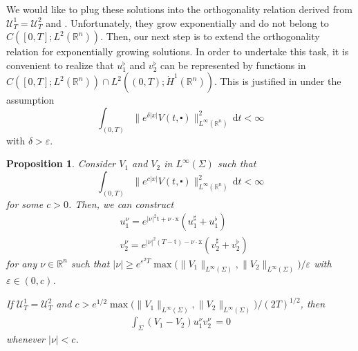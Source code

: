 \documentclass[10pt,a4paper]{amsart}
\newtheorem{proposition}{Proposition}[section]
\newcommand{\R}{\mathbb{R}}
\newcommand{\dd}{\mathrm{d}}
\newcommand{\tm}{\mathrm{t}}
\newcommand{\x}{\mathrm{x}}
\begin{document}
We would like to plug these solutions into the orthogonality relation derived from
$\mathcal{U}_T^1 = \mathcal{U}_T^2$ and . Unfortunately, they grow
exponentially and do not belong to $C([0,T]; L^2(\R^n))$. Then, our next step is to extend the
orthogonality relation for exponentially growing solutions. In order to undertake this task,
it is convenient to realize that $u_1^\flat$ and $v_2^\flat$ can be represented by functions in
$C([0, T]; L^2(\R^n))\cap L^2((0,T); \dot H^1(\R^n))$. This is justified in  under the 
assumption 
\begin{equation*}
\int_{(0,T)} \| e^{\delta |x|} V(t, \centerdot) \|_{L^\infty (\R^n)}^2 \, \dd t < \infty
\end{equation*}
with $\delta > \varepsilon$.


\begin{proposition}\label{prop:extension-ortho}\sl 
Consider $V_1$ and $V_2 $ in $ L^\infty (\Sigma)$
such that
\[\int_{(0,T)} \| e^{c |x|} V(t, \centerdot) \|_{L^\infty (\R^n)}^2 \, \dd t < \infty\]
for some $c>0$.
Then, we can construct 
\begin{align*}
& u_1^\nu = e^{|\nu|^2 \tm + \nu \cdot \x} (u_1^\sharp + u_1^\flat)\\
& v_2^\nu = e^{|\nu|^2 (T - \tm) - \nu \cdot \x} (v_2^\sharp + v_2^\flat)
\end{align*}
for any $\nu \in \R^n $ such that 
$|\nu| \geq e^{\varepsilon^2 T} \max\big(\| V_1 \|_{L^\infty (\Sigma)}, \| V_2 \|_{L^\infty (\Sigma)}\big)/\varepsilon$ with $\varepsilon \in (0, c)$.

If $\mathcal{U}_{T}^{1}=\mathcal{U}_{T}^{2}$ and 
$c > e^{1/2} \max\big(\| V_1 \|_{L^\infty (\Sigma)}, \| V_2 \|_{L^\infty (\Sigma)}\big)/(2T)^{1/2}$, then
\begin{align}\label{17}
   \int_\Sigma (V_1 - V_2) u_1^\nu v_2^\nu \, =0
\end{align}
whenever $|\nu| < c$.
\end{proposition}
\end{document}
